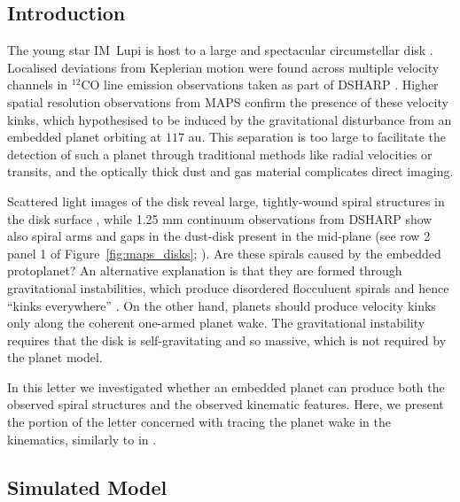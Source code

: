 \subsection{Introduction}

The young star IM~Lupi is host to a large and spectacular circumstellar disk \citep{panic2009,avenhaus2018,cleeves2016,pinte2018}.
Localised deviations from Keplerian motion were found across multiple velocity channels in $^{12}$CO line emission observations \citep{pinte2020} taken as part of DSHARP \citep{huang2018,andrews2018}.
Higher spatial resolution observations from MAPS \citep{oberg2021} confirm the presence of these velocity kinks, which \citet{pinte2020} hypothesised to be induced by the gravitational disturbance from an embedded planet orbiting at $117$ au.
This separation is too large to facilitate the detection of such a planet through traditional methods like radial velocities or transits, and the optically thick dust and gas material complicates direct imaging.

Scattered light images of the disk reveal large, tightly-wound spiral structures in the disk surface \citep[see Figure~\ref{fig:im_lup};][]{avenhaus2018},
while 1.25 mm continuum observations from DSHARP show also spiral arms and gaps in the dust-disk present in the mid-plane (see row 2 panel 1 of Figure~\ref{fig:maps_disks}; \citealt{huang2018}).
Are these spirals caused by the embedded protoplanet?
An alternative explanation is that they are formed through gravitational instabilities, which produce disordered flocculuent spirals and hence ``kinks everywhere'' \citep{hall2020}.
On the other hand, planets should produce velocity kinks only along the coherent one-armed planet wake.
The gravitational instability requires that the disk is self-gravitating and so massive, which is not required by the planet model.

In this letter we investigated whether an embedded planet can produce both the observed spiral structures and the observed kinematic features.
Here, we present the portion of the letter concerned with tracing the planet wake in the kinematics, similarly to in \citet{calcino2022}.

\subsection{Simulated Model}

